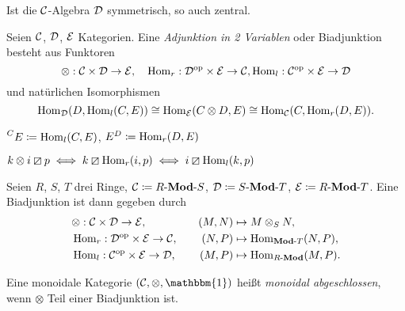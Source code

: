 \documentclass{cheat-sheet}
\newcommand{\lhhe}{\boxslash} %
\newcommand{\LonelyHeart}{\{ \, \heartsuit \, \}} %
\newcommand{\UnitOb}{\mathbbm{1}} %
\begin{document}
\begin{bem}
  Ist die $\mathcal{C}$-Algebra $\mathcal{D}$ symmetrisch, so auch zentral.
\end{bem}

\begin{defn}
  Seien $\mathcal{C}$, $\mathcal{D}$, $\mathcal{E}$ Kategorien. Eine \emph{Adjunktion in 2 Variablen} oder Biadjunktion besteht aus Funktoren
  \[
    \otimes : \mathcal{C} \times \mathcal{D} \to \mathcal{E}, \quad
    \operatorname{Hom}_r : \mathcal{D}^{\mathrm{op}} \times \mathcal{E} \to \mathcal{C},
    \operatorname{Hom}_l : \mathcal{C}^{\mathrm{op}} \times \mathcal{E} \to \mathcal{D}
  \]
  und natürlichen Isomorphismen
  \[
    \operatorname{Hom}_{\mathcal{D}}(D, \operatorname{Hom}_l(C, E)) \cong \operatorname{Hom}_{\mathcal{E}}(C \otimes D, E) \cong \operatorname{Hom}_{\mathcal{C}}(C, \operatorname{Hom}_r(D, E)).
  \]
\end{defn}

\begin{nota}
  $\prescript{C}{} E \coloneqq \operatorname{Hom}_l(C, E)$,
  $E^D \coloneqq \operatorname{Hom}_r(D, E)$
\end{nota}

\begin{bem}
  $k \otimes i \lhhe p \iff k \lhhe \Hom_r(i, p) \iff i \lhhe \Hom_l(k, p)$
\end{bem}

\begin{bsp}
  Seien $R$, $S$, $T$ drei Ringe, $\mathcal{C} \coloneqq {R}\text{-}\mathbf{Mod}\text{-}{S}$, $\mathcal{D} \coloneqq {S}\text{-}\mathbf{Mod}\text{-}{T}$, $\mathcal{E} \coloneqq {R}\text{-}\mathbf{Mod}\text{-}{T}$. Eine Biadjunktion ist dann gegeben durch
  \begin{alignat*}{3}
    & \otimes : \mathcal{C} \times \mathcal{D} \to \mathcal{E}, \quad & (M, N) & \mapsto M \otimes_S N, \\
    & \operatorname{Hom}_r : \mathcal{D}^{\mathrm{op}} \times \mathcal{E} \to \mathcal{C}, \quad & (N, P) & \mapsto \operatorname{Hom}_{\mathbf{Mod}\text{-}{T}}(N, P), \\
    & \operatorname{Hom}_l : \mathcal{C}^{\mathrm{op}} \times \mathcal{E} \to \mathcal{D}, \quad & (M, P) & \mapsto \operatorname{Hom}_{{R}\text{-}\mathbf{Mod}}(M, P).
  \end{alignat*}
\end{bsp}

\begin{defn}
  Eine monoidale Kategorie $(\Cat, \otimes, \UnitOb)$ heißt \emph{monoidal abgeschlossen}, wenn $\otimes$ Teil einer Biadjunktion ist.
\end{defn}

\begin{bspe}
   \quad
  \inlineitem{$(\SetC, \times, \LonelyHeart)$}
\end{bspe}

\end{document}
